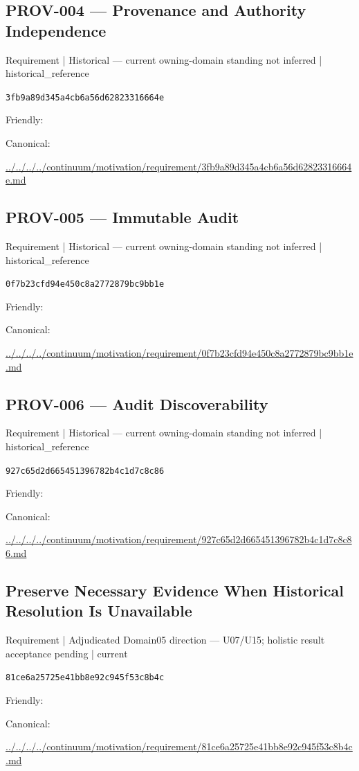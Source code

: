 \documentclass[10pt,a4paper]{article}
\begin{document}
\subsection*{PROV-004 — Provenance and Authority Independence}
{\small Requirement | Historical — current owning-domain standing not inferred | historical\_reference}\par
\texttt{3fb9a89d345a4cb6a56d62823316664e}\par
Friendly: \par
Canonical: \par
{\footnotesize\url{../../../../continuum/motivation/requirement/3fb9a89d345a4cb6a56d62823316664e.md}}\par
\subsection*{PROV-005 — Immutable Audit}
{\small Requirement | Historical — current owning-domain standing not inferred | historical\_reference}\par
\texttt{0f7b23cfd94e450c8a2772879bc9bb1e}\par
Friendly: \par
Canonical: \par
{\footnotesize\url{../../../../continuum/motivation/requirement/0f7b23cfd94e450c8a2772879bc9bb1e.md}}\par
\subsection*{PROV-006 — Audit Discoverability}
{\small Requirement | Historical — current owning-domain standing not inferred | historical\_reference}\par
\texttt{927c65d2d665451396782b4c1d7c8c86}\par
Friendly: \par
Canonical: \par
{\footnotesize\url{../../../../continuum/motivation/requirement/927c65d2d665451396782b4c1d7c8c86.md}}\par
\subsection*{Preserve Necessary Evidence When Historical Resolution Is Unavailable}
{\small Requirement | Adjudicated Domain05 direction — U07/U15; holistic result acceptance pending | current}\par
\texttt{81ce6a25725e41bb8e92c945f53c8b4c}\par
Friendly: \par
Canonical: \par
{\footnotesize\url{../../../../continuum/motivation/requirement/81ce6a25725e41bb8e92c945f53c8b4c.md}}\par
\end{document}
